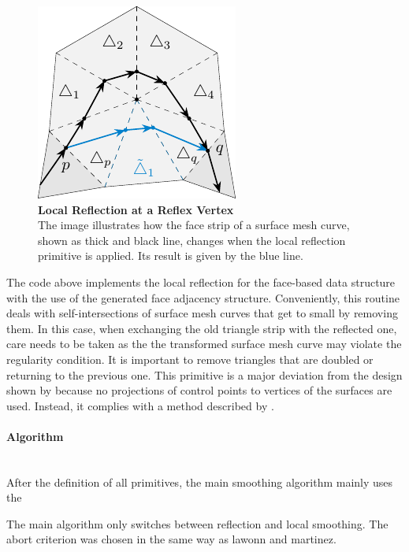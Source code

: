 \documentclass{stdlocal}
\begin{document}
  \begin{figure}
    \centering
    \includegraphics[width=0.45\linewidth]{figures/local-reflection.pdf}
    \caption[Local Reflection at a Reflex Vertex]{%
      \textbf{Local Reflection at a Reflex Vertex}\\
      The image illustrates how the face strip of a surface mesh curve, shown as thick and black line, changes when the local reflection primitive is applied.
      Its result is given by the blue line.
    }
    \label{fig:local-reflection}
  \end{figure}

  The code above implements the local reflection for the face-based data structure with the use of the generated face adjacency structure.
  Conveniently, this routine deals with self-intersections of surface mesh curves that get to small by removing them.
  In this case, when exchanging the old triangle strip with the reflected one, care needs to be taken as the the transformed surface mesh curve may violate the regularity condition.
  It is important to remove triangles that are doubled or returning to the previous one.
  This primitive is a major deviation from the design shown by \textcite{lawonn2014} because no projections of control points to vertices of the surfaces are used.
  Instead, it complies with a method described by \textcite{mancinelli2022}.

  \paragraph{Algorithm}\hfill\\
  After the definition of all primitives, the main smoothing algorithm mainly uses the

  The main algorithm only switches between reflection and local smoothing.
  The abort criterion was chosen in the same way as lawonn and martinez.
\end{document}
